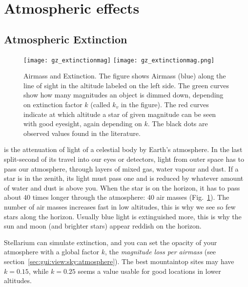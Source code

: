 \section{Atmospheric effects}
\label{sec:phenomena:Atmosphere}

\subsection{Atmospheric Extinction}
\label{sec:phenomena:Extinction}

\begin{figure}[tbp]
\centering
\ifpdf
\texttt{[image: gz\_extinctionmag]}
\else
\texttt{[image: gz\_extinctionmag.png]}
\fi
\caption{Airmass and Extinction.  The figure shows Airmass (blue)
  along the line of sight in the altitude labeled on the left side.
  The green curves show how many magnitudes an object is dimmed down,
  depending on extinction factor $k$ (called $k_v$ in the figure). The
  red curves indicate at which altitude a star of given magnitude can
  be seen with good eyesight, again depending on $k$. The black dots
  are observed values found in the literature.}
\label{fig:Extinction}
\end{figure}

 is the attenuation of light of a
celestial body by Earth's atmosphere. In the last split-second of its
travel into our eyes or detectors, light from outer space has to pass
our atmosphere, through layers of mixed gas, water vapour and dust. If
a star is in the zenith, its light must pass one 
and is reduced by whatever amount of water and dust is above you. When
the star is on the horizon, it has to pass about 40 times longer
through the atmosphere: 40 air masses (Fig.~\ref{fig:Extinction}). The
number of air masses increases fast in low altitudes, this is why we
see so few stars along the horizon. Usually blue light is extinguished
more, this is why the sun and moon (and brighter stars) appear reddish
on the horizon.

Stellarium can simulate extinction, and you can set the opacity of
your atmosphere with a global factor $k$, the \emph{magnitude loss per
  airmass} (see section~\ref{sec:gui:view:sky:atmosphere}). The best
mountaintop sites may have $k=0.15$, while $k=0.25$ seems a value
usable for good locations in lower altitudes.

